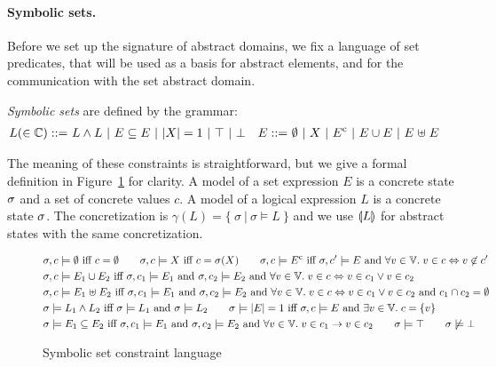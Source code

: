 \paragraph{Symbolic sets.}
Before we set up the signature of abstract domains, we fix a language
of set predicates, that will be used as a basis for abstract elements,
and for the communication with the set abstract domain.
\begin{definition}
  \label{d:1:symsets}
  {\em Symbolic sets} are defined by the grammar:
  \begin{align*}
    L (\in \mathbb{C}) ::=
    & \ L \wedge L \
    | \ E \subseteq E \
    | \ |{X}| = 1 \
    | \ \top \
    | \ \bot
    & E ::=
    & \ \emptyset \ | \ X \ | \ {E}^{\mathrm{c}} \ | \ E \cup E \ | \ E \mathrel{\uplus} E
  \end{align*}
\end{definition}
The meaning of these constraints is straightforward, but we give a formal
definition in Figure~\ref{f:4:symsets} for clarity.
A model of a set expression $E$ is a concrete state $\sigma$ and a set
of concrete values $c$.
A model of a logical expression $L$ is a concrete state $\sigma$.
The concretization is $\gamma(L) = \{\ \sigma \ |\  \sigma \models L\ \}$
and we use $\llparenthesis L \rrparenthesis$ for abstract states with the same concretization.
\begin{figure}[t]
  \begin{align*}
    & \sigma, c \models \emptyset \textrm{ iff } c = \emptyset
    \qquad
    \sigma, c \models X \textrm{ iff } c = \sigma(X)
    \qquad \sigma, c \models {E}^{\mathrm{c}}
    \textrm{ iff }
    \sigma, c' \models{E}
    \textrm{ and } \forall v \in \mathbb{V}.
    \; v \in c \Leftrightarrow v \not\in c'
    \\
    & \sigma, c \models E_1 \cup E_2
    \textrm{ iff }
    \sigma, c_1 \models E_1
    \textrm{ and } \sigma, c_2 \models E_2
    \textrm{ and }
    \forall v \in \mathbb{V}. \; v \in c \Leftrightarrow v \in c_1 \vee
    v \in c_2
    \\
    & \sigma, c \models E_1 \mathrel{\uplus} E_2
    \textrm{ iff }
    \sigma, c_1 \models E_1
    \textrm{ and } \sigma, c_2 \models E_2
    \textrm{ and }
    \forall v \in \mathbb{V}. \; v \in c \Leftrightarrow v \in c_1 \vee
    v \in c_2
    \textrm{ and } c_1 \cap c_2 = \emptyset
    \\
    & \sigma \models L_1 \wedge L_2
    \textrm{ iff }
    \sigma \models L_1 \textrm{ and } \sigma \models L_2
    \qquad
    \sigma \models |{E}| = 1
    \textrm{ iff }
    \sigma, c \models E \textrm{ and } \exists v \in \mathbb{V}. \; c = \{ v \}
    \\
    & \sigma \models E_1 \subseteq E_2
    \textrm{ iff }
    \sigma, c_1 \models E_1 \textrm{ and } \sigma, c_2 \models E_2
    \textrm{ and } \forall v \in \mathbb{V}. \; v \in c_1 \rightarrow v \in c_2
    \qquad \sigma \models \top
    \qquad \sigma \not\models \bot
  \end{align*}
  \caption{Symbolic set constraint language}
  \label{f:4:symsets}
\end{figure}
